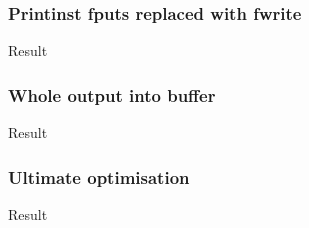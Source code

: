 \documentclass{beamer}
\begin{document}
\begin{frame}\frametitle{Printinst fputs replaced with fwrite}
\begin{center}
Result
\end{center}
\end{frame}

\begin{frame}\frametitle{Whole output into buffer}
\begin{center}
Result
\end{center}
\end{frame}

\begin{frame}\frametitle{Ultimate optimisation}
\begin{center}
Result
\end{center}
\end{frame}
\end{document}
